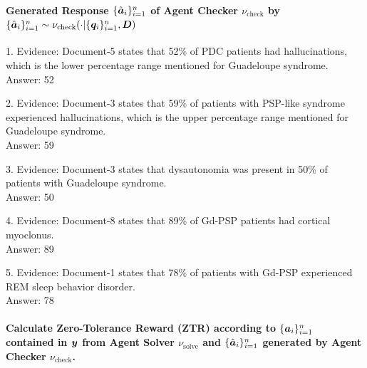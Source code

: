 \documentclass[10pt, a4paper, logo]{googledeepmind} %
\begin{document}
\paragraph{Generated Response $\{\hat{{\bm{a}}}_i\}_{i=1}^n$ of Agent Checker $\nu_\text{check}$ by $\{\hat{{\bm{a}}}_i\}_{i=1}^n\sim\nu_\text{check}(\cdot|\{{{\bm{q}}}_i\}_{i=1}^n,{\bm{D}})$}

\begin{tcolorbox}[
    enhanced,
    breakable,
    colback=promptblue,            %
    colframe=bordergray,           %
    boxrule=1pt,                   %
    sharp corners,                 %
]
\begin{flushleft}
1. Evidence: Document-5 states that 52\% of PDC patients had hallucinations, which is the lower percentage range mentioned for Guadeloupe syndrome.\\
Answer: 52
\vspace{1em}

2. Evidence: Document-3 states that 59\% of patients with PSP-like syndrome experienced hallucinations, which is the upper percentage range mentioned for Guadeloupe syndrome.\\
Answer: 59
\vspace{1em}

3. Evidence: Document-3 states that dysautonomia was present in 50\% of patients with Guadeloupe syndrome.\\
Answer: 50 
\vspace{1em}

4. Evidence: Document-8 states that 89\% of Gd-PSP patients had cortical myoclonus.\\
Answer: 89 
\vspace{1em}

5. Evidence: Document-1 states that 78\% of patients with Gd-PSP experienced REM sleep behavior disorder.\\
Answer: 78 
\vspace{1em}
\end{flushleft}
\end{tcolorbox}

\paragraph{Calculate Zero-Tolerance Reward (ZTR) according to $\{{\bm{a}}_i\}_{i=1}^n$ contained in ${\bm{y}}$ from Agent Solver $\nu_\text{solve}$ and $\{\hat{{\bm{a}}}_i\}_{i=1}^n$ generated by Agent Checker $\nu_\text{check}$.}
\end{document}
